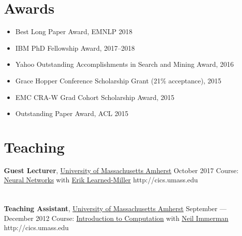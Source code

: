 \documentclass{resume}
\begin{document}
\section{Awards}
\begin{itemize}
\item {Best Long Paper Award, EMNLP 2018}
\item {IBM PhD Fellowship Award, 2017--2018}
\item {Yahoo Outstanding Accomplishments in Search and Mining Award, 2016}
\item {Grace Hopper Conference Scholarship Grant (21\% acceptance), 2015}
\item {EMC CRA-W Grad Cohort Scholarship Award, 2015}
\item {Outstanding Paper Award, ACL 2015}
\end{itemize}
\clearpage

\nocite{*}





\section{Teaching}
\employer
    {\textbf{Guest Lecturer}, \href{http://cics.umass.edu}{University of Massachusetts Amherst}}
    {October 2017}
    {Course: \href{https://compsci682.github.io/syllabus.html}{Neural Networks} with \href{http://cs.umass.edu/~elm}{Erik Learned-Miller}} {http://cics.umass.edu}
\\ \\ \\ 
\employer
    {\textbf{Teaching Assistant}, \href{http://cics.umass.edu}{University of Massachusetts Amherst}}
    {September --- December 2012}
    {Course: \href{https://people.cs.umass.edu/~immerman/cs250/syllabus.html}{Introduction to Computation} with \href{http://cs.umass.edu/~immerman}{Neil Immerman}} {http://cics.umass.edu}
\end{document}
